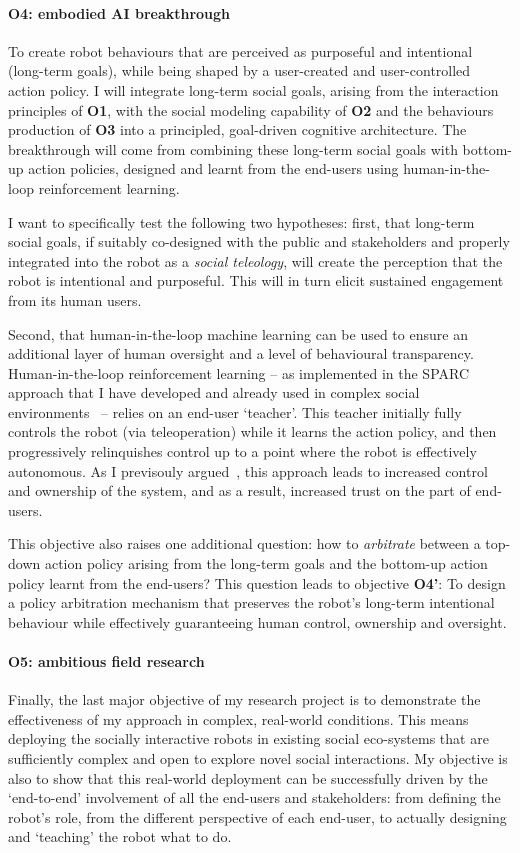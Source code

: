 \paragraph{\bf O4: embodied AI breakthrough} To create robot behaviours that are
perceived as purposeful and intentional (long-term goals), while being shaped by
a user-created and user-controlled action policy. I will integrate long-term
social goals, arising from the interaction principles of \textbf{O1}, with the
social modeling capability of \textbf{O2} and the behaviours production of
\textbf{O3} into a principled, goal-driven cognitive architecture. The
breakthrough will come from combining these long-term social goals with
bottom-up action policies, designed and learnt from the end-users using
human-in-the-loop reinforcement learning.

I want to specifically test the following two hypotheses: first, that long-term
social goals, if suitably co-designed with the public and stakeholders and
properly integrated into the robot as a \emph{social teleology}, will create the
perception that the robot is intentional and purposeful. This will in turn
elicit sustained engagement from its human users.

Second, that human-in-the-loop machine learning can
be used to ensure an additional layer of human oversight and a level of
behavioural transparency.  Human-in-the-loop reinforcement learning -- as
implemented in the SPARC approach that I have developed and already used in
complex social
environments~\parencite{senft2017supervised,senft2019teaching,winkle2020insitu}
-- relies on an end-user `teacher'. This teacher initially fully controls the
robot (via teleoperation) while it learns the action policy, and then
progressively relinquishes control up to a point where the robot is effectively
autonomous. As I previsouly argued~\parencite{senft2019teaching}, this approach
leads to increased control and ownership of the system, and as a result,
increased trust on the part of end-users.

This objective also raises one additional question: how to \emph{arbitrate}
between a top-down action policy arising from the long-term goals and the
bottom-up action policy learnt from the end-users? This question leads to
objective {\bf O4'}: To design a policy arbitration mechanism that preserves the
robot's long-term intentional behaviour while effectively guaranteeing human
control, ownership and oversight.

\paragraph{\bf O5: ambitious field research} Finally, the last major objective
of my research project is to demonstrate the effectiveness of my approach in
complex, real-world conditions. This means deploying the socially interactive
robots in existing social eco-systems that are sufficiently complex and open to
explore novel social interactions. My objective is also to show that this
real-world deployment can be successfully driven by the `end-to-end' involvement
of all the end-users and stakeholders: from defining the robot's role, from the
different perspective of each end-user, to actually designing and `teaching' the
robot what to do.

